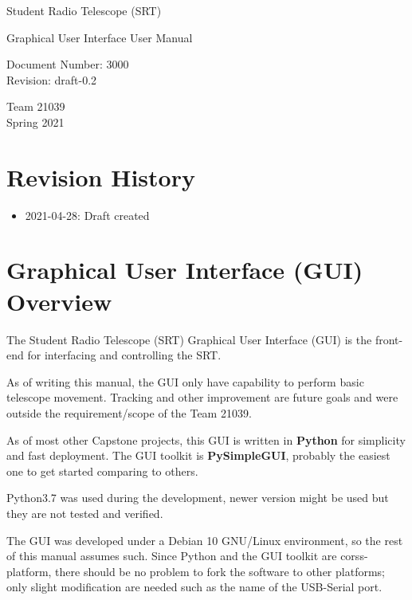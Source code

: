 \documentclass{article}
\begin{document}
\begin{titlepage}
  \begin{center}
    
    \vspace*{5cm}
    \huge Student Radio Telescope (SRT)
    
    \vspace*{2cm}
    \Large Graphical User Interface User Manual
    
    \vspace*{2cm}
    \large Document Number: 3000\\
    Revision: draft-0.2
    
    \vspace*{2.0cm}
    \large
    Team 21039\\
    Spring 2021
    
  \end{center}
\end{titlepage}

\tableofcontents
\pagebreak

\section{Revision History}
\begin{itemize}
  \item 2021-04-28: Draft created
\end{itemize}


\section{Graphical User Interface (GUI) Overview}
The Student Radio Telescope (SRT) Graphical User Interface (GUI) is the front-end for interfacing and controlling the SRT.

As of writing this manual, the GUI only have capability to perform basic telescope movement. Tracking and other improvement are future goals and were outside the requirement/scope of the Team 21039.

As of most other Capstone projects, this GUI is written in \textbf{Python} for simplicity and fast deployment. The GUI toolkit is \textbf{PySimpleGUI}, probably the easiest one to get started comparing to others.

Python3.7 was used during the development, newer version might be used but they are not tested and verified.

The GUI was developed under a Debian 10 GNU/Linux environment, so the rest of this manual assumes such. Since Python and the GUI toolkit are corss-platform, there should be no problem to fork the software to other platforms; only slight modification are needed such as the name of the USB-Serial port. 
\end{document}
